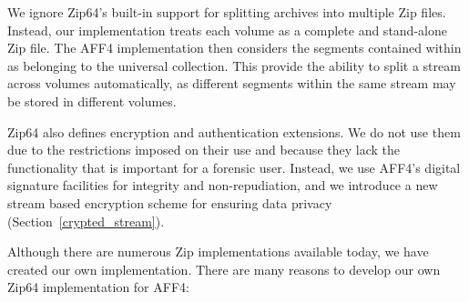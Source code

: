 \documentclass[10pt, conference]{IEEEtran}
\begin{document}
We ignore Zip64's built-in support for splitting archives into
multiple Zip files. Instead, our implementation treats each volume as
a complete and stand-alone Zip file. The AFF4 implementation then
considers the segments contained within as belonging to the universal
collection. This provide the ability to split a stream across volumes
automatically, as different segments within the same stream may be
stored in different volumes.

Zip64 also defines encryption and authentication extensions. We do not
use them due to the restrictions imposed on their use and because they
lack the functionality that is important for a forensic user. Instead,
we use AFF4's digital signature facilities for integrity and
non-repudiation, and we introduce a new stream based encryption scheme
for ensuring data privacy (Section~\ref{crypted_stream}).

Although there are numerous Zip implementations available today, we
have created our own implementation. There are many reasons to develop
our own Zip64 implementation for AFF4:
\end{document}
